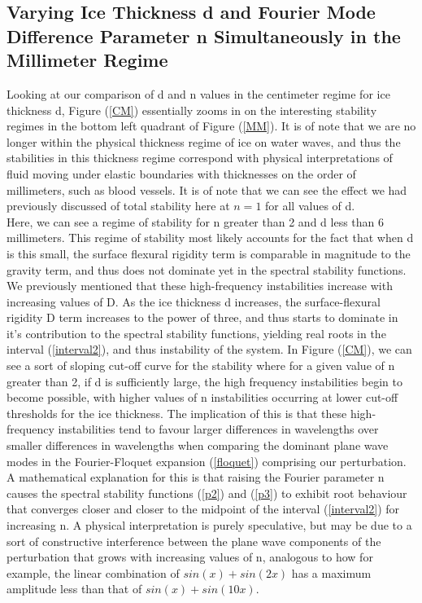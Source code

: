\documentclass{article}
\begin{document}
\subsection{Varying Ice Thickness d and Fourier Mode Difference Parameter  n Simultaneously in the Millimeter Regime}

Looking at our comparison of d and n values in the centimeter regime for ice thickness d, Figure (\ref{CM}) essentially zooms in on the interesting stability regimes in the bottom left quadrant of Figure (\ref{MM}). It is of note that we are no longer within the physical thickness regime of ice on water waves, and thus the stabilities in this thickness regime correspond with physical interpretations of fluid moving under elastic boundaries with thicknesses on the order of millimeters, such as blood vessels. It is of note that we can see the effect we had previously discussed of total stability here at \(n = 1\) for all values of d. 
\\

Here, we can see a regime of stability for n greater than 2 and d less than 6 millimeters. This regime of stability most likely accounts for the fact that when d is this small, the surface flexural rigidity term is comparable in magnitude to the gravity term, and thus does not dominate yet in the spectral stability functions. We previously mentioned that these high-frequency instabilities increase with increasing values of D. As the ice thickness d increases, the surface-flexural rigidity D term increases to the power of three, and thus starts to dominate in it's contribution to the spectral stability functions, yielding real roots in the interval (\ref{interval2}), and thus instability of the system. In Figure (\ref{CM}), we can see a sort of sloping cut-off curve for the stability where for a given value of n greater than 2, if d is sufficiently large, the high frequency instabilities begin to become possible, with higher values of n instabilities occurring at lower cut-off thresholds for the ice thickness. The implication of this is that these high-frequency instabilities tend to favour larger differences in wavelengths over smaller differences in wavelengths when comparing the dominant plane wave modes in the Fourier-Floquet expansion (\ref{floquet}) comprising our perturbation. A mathematical explanation for this is that raising the Fourier parameter n causes the spectral stability functions (\ref{p2}) and (\ref{p3}) to exhibit root behaviour that converges closer and closer to the midpoint of the interval (\ref{interval2}) for increasing n. A physical interpretation is purely speculative, but may be due to a sort of constructive interference between the plane wave components of the perturbation that grows with increasing values of n, analogous to how for example, the linear combination of \(sin(x) + sin(2x)\) has a maximum amplitude less than that of \(sin(x) + sin(10x)\). 
\\
\\
\end{document}

